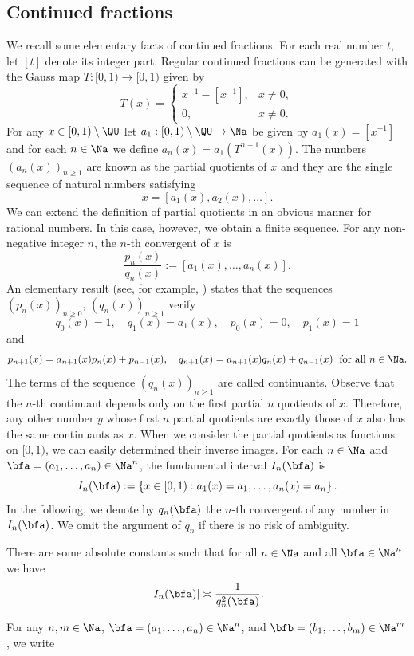 \documentclass[12pt,a4paper]{amsart}
\begin{document}
\subsection{Continued fractions}
We recall some elementary facts of continued fractions. For each real number $t$, let $[t]$ denote its integer part. Regular continued fractions can be generated with the Gauss map $T:[0,1)\to [0,1)$ given by 
\[
T(x) = 
\begin{cases}
x^{-1} - [x^{-1}], & x\neq 0, \\
0, & x\neq 0.
\end{cases}
\]
For any $x\in [0,1)\setminus \QU$ let $a_1:[0,1)\setminus \QU\to\Na$ be given by $a_1(x)= [x^{-1}]$ and for each $n\in\Na$ we define $a_n(x)=a_1(T^{n-1}(x))$.  The numbers $(a_n(x))_{n\geq 1}$ are known as the partial quotients of $x$ and they are the single sequence of natural numbers satisfying
\[
x=
[a_1(x),a_2(x),\ldots].
\]
We can extend the definition of partial quotients in an obvious manner for rational numbers. In this case, however, we obtain a finite sequence. For any non-negative integer $n$, the $n$-th convergent of $x$ is 
\[
\frac{p_n(x)}{q_n(x)}
:=
[a_1(x), \ldots, a_n(x)].
\]
An elementary result (see, for example, \cite[Proposition 1.1]{HensleyBook}) states that the sequences $(p_n(x))_{n\geq 0}$, $(q_n(x))_{n\geq 1}$ verify
\[
q_0(x)=1, \quad
q_{1}(x)=a_1(x), \quad
p_0(x)=0, \quad
p_1(x)=1
\]
and 
\[
p_{n+1}(x)=a_{n+1}(x)p_{n}(x) + p_{n-1}(x), \quad
q_{n+1}(x)=a_{n+1}(x)q_{n}(x)+q_{n-1}(x)
\;\text{ for all } n\in\Na.
\]
The terms of the sequence $(q_n(x))_{n\geq 1}$ are called continuants. Observe that the $n$-th continuant depends only on the first partial $n$ quotients of $x$. Therefore, any other number $y$ whose first $n$ partial quotients are exactly those of $x$ also has the same continuants as $x$. When we consider the partial quotients as functions on $[0,1)$, we can easily determined their inverse images. For each $n\in\Na$ and $\bfa=(a_1,\ldots, a_n)\in\Na^n$, the fundamental interval $I_n(\bfa)$ is
\[
I_n(\bfa)
:=
\left\{ x\in [0,1): a_1(x)=a_1,\ldots, a_n(x)=a_n\right\}.
\]
In the following, we denote by $q_n(\bfa)$ the $n$-th convergent of any number in $I_n(\bfa)$. We omit the argument of $q_n$ if there is no risk of ambiguity.
\begin{lem01}
There are some absolute constants such that for all $n\in\Na$ and all $\bfa\in\Na^n$ we have
\[
|I_n(\bfa)|
\asymp
\frac{1}{q_n^2(\bfa)}.
\]
\end{lem01}
For any $n,m\in\Na$, $\bfa=(a_1,\ldots, a_n)\in\Na^n$, and $\bfb=(b_1,\ldots, b_m)\in\Na^m$, we write
\end{document}
